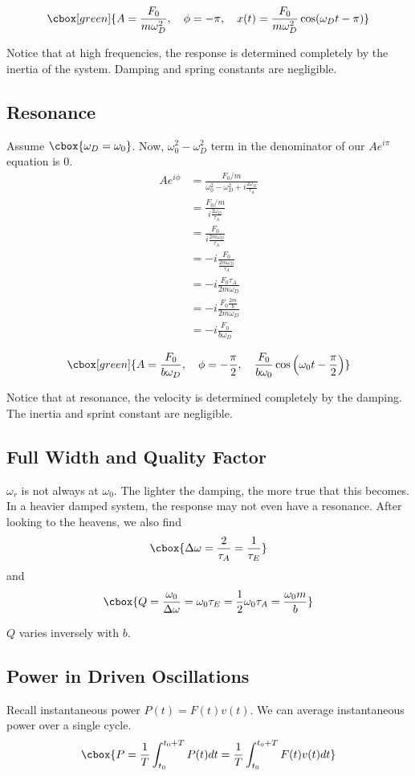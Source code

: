 \documentclass{hw}
\begin{document}
\[\cbox[green]{
    A = \frac{F_0}{m\omega_D^2}, \quad 
    \phi = -\pi, \quad 
    x(t) = \frac{F_0}{m\omega_D^2}\cos(\omega_D t - \pi)
}\]

Notice that at high frequencies, the response is determined completely by the
inertia of the system. Damping and spring constants are negligible.

\subsection{Resonance}
Assume $\cbox{\omega_D = \omega_0}$. Now, $\omega_0^2 - \omega_D^2$ term in the
denominator of our $Ae^{i\pi}$ equation is 0.
\begin{align*}
  Ae^{i\phi} &= \frac{F_0/m}{\omega_0^2 - \omega_D^2  + i \frac{2\omega_D}{\tau_A}} \\
             &= \frac{F_0/m}{i \frac{2\omega_D}{\tau_A}} \\
             &= \frac{F_0}{i \frac{2 m \omega_D}{\tau_A}} \\
             &= -i\frac{F_0}{\frac{2 m \omega_D}{\tau_A}} \\
             &= -i\frac{F_0 \tau_A}{2 m \omega_D} \\
             &= -i\frac{F_0 \frac{2m}{b}}{2 m \omega_D} \\
             &= -i\frac{F_0}{b \omega_D} 
\end{align*}

\[\cbox[green]{
  A = \frac{F_0}{b \omega_D}, 
  \quad \phi = -\frac{\pi}{2},
  \quad \frac{F_0}{b \omega_0} \cos\left( \omega_0 t - \frac{\pi}{2} \right)
}\]

Notice that at resonance, the velocity is determined completely by the damping.
The inertia and sprint constant are negligible.

\subsection{Full Width and Quality Factor}
$\omega_r$ is not always at $\omega_0$. The lighter the damping, the more true
that this becomes. In a heavier damped system, the response may not even have a
resonance. After looking to the heavens, we also find
\[\cbox{
  \Delta \omega = \frac{2}{\tau_A} = \frac{1}{\tau_E}
}\]
and
\[\cbox{
  Q = \frac{\omega_0}{\Delta \omega} 
    = \omega_0 \tau_E 
    = \frac{1}{2} \omega_0 \tau_A 
    = \frac{\omega_0 m}{b}
}\]

$Q$ varies inversely with $b$.

\subsection{Power in Driven Oscillations}
Recall instantaneous power $P(t) = F(t)v(t)$. We can average instantaneous
power over a single cycle.
\[\cbox{
  P = \frac{1}{T} \int_{t_0}^{t_0 + T} P(t) dt
    = \frac{1}{T} \int_{t_0}^{t_0 + T} F(t)v(t) dt
}\]
\end{document}
